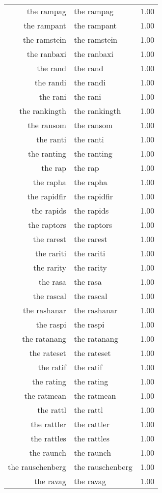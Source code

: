 \begin{table}[ht]
\begin{tabular}{rlr}
  the rampag & the rampag & 1.00 \\ 
  the rampant & the rampant & 1.00 \\ 
  the ramstein & the ramstein & 1.00 \\ 
  the ranbaxi & the ranbaxi & 1.00 \\ 
  the rand & the rand & 1.00 \\ 
  the randi & the randi & 1.00 \\ 
  the rani & the rani & 1.00 \\ 
  the rankingth & the rankingth & 1.00 \\ 
  the ransom & the ransom & 1.00 \\ 
  the ranti & the ranti & 1.00 \\ 
  the ranting & the ranting & 1.00 \\ 
  the rap & the rap & 1.00 \\ 
  the rapha & the rapha & 1.00 \\ 
  the rapidfir & the rapidfir & 1.00 \\ 
  the rapids & the rapids & 1.00 \\ 
  the raptors & the raptors & 1.00 \\ 
  the rarest & the rarest & 1.00 \\ 
  the rariti & the rariti & 1.00 \\ 
  the rarity & the rarity & 1.00 \\ 
  the rasa & the rasa & 1.00 \\ 
  the rascal & the rascal & 1.00 \\ 
  the rashanar & the rashanar & 1.00 \\ 
  the raspi & the raspi & 1.00 \\ 
  the ratanang & the ratanang & 1.00 \\ 
  the rateset & the rateset & 1.00 \\ 
  the ratif & the ratif & 1.00 \\ 
  the rating & the rating & 1.00 \\ 
  the ratmean & the ratmean & 1.00 \\ 
  the rattl & the rattl & 1.00 \\ 
  the rattler & the rattler & 1.00 \\ 
  the rattles & the rattles & 1.00 \\ 
  the raunch & the raunch & 1.00 \\ 
  the rauschenberg & the rauschenberg & 1.00 \\ 
  the ravag & the ravag & 1.00 \\ 

\end{tabular}
\end{table}
